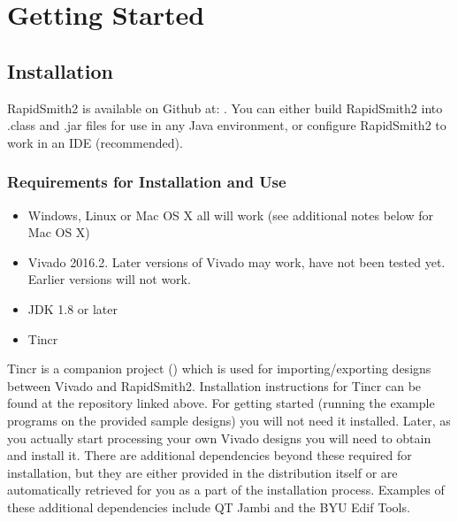 \newpage
\section{Getting Started}
\graphicspath{{./techReportFigures/sec3_gettingStarted/}}

\subsection{Installation}

RapidSmith2 is available on Github at:
{}.
You can either build RapidSmith2 into .class and .jar files for use in any Java
environment, or configure RapidSmith2 to work in an IDE (recommended).

\subsubsection{Requirements for Installation and Use}
\begin{itemize}
  \item Windows, Linux or Mac OS X all will work (see additional notes below for
  Mac OS X)
  \item Vivado 2016.2. Later versions of Vivado may work, have not been tested
  yet. Earlier versions will not work.
  \item JDK 1.8 or later
  \item Tincr 
\end{itemize}

Tincr is a companion project
({}) which is used for
importing/exporting designs between Vivado and RapidSmith2. Installation
instructions for Tincr can be found at the repository linked above. For getting
started (running the example programs on the provided sample designs) you will
not need it installed. Later, as you  actually start processing your own Vivado
designs you will need to obtain and install it. There are additional
dependencies beyond these required for installation, but they are either
provided in the distribution itself or are automatically retrieved for you as a
part of the installation process. Examples of these additional dependencies
include QT Jambi and the BYU Edif Tools.
 
